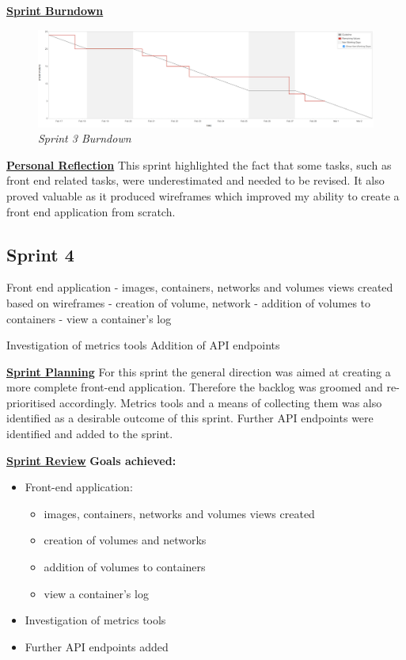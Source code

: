\underline{\textbf{Sprint Burndown}}\newline
\begin{figure}[!ht]
\centering
\includegraphics*[width=\textwidth]{images/sprint3}
\caption{\em Sprint 3 Burndown}
\label{fig:sprint3}
\end{figure}

\underline{\textbf{Personal Reflection}}\newline
This sprint highlighted the fact that some tasks, such as front end related tasks, were underestimated and needed to be revised. It also proved valuable as it produced wireframes which improved my ability to create a front end application from scratch.

\subsection{Sprint 4}
Front end application
	- images, containers, networks and volumes views created based on wireframes
	- creation of volume, network
	- addition of volumes to containers
	- view a container's log
	
Investigation of metrics tools
Addition of API endpoints

\underline{\textbf{Sprint Planning}}\newline
For this sprint the general direction was aimed at creating a more complete front-end application. Therefore the backlog was groomed and re-prioritised accordingly. Metrics tools and a means of collecting them was also identified as a desirable outcome of this sprint. Further API endpoints were identified and added to the sprint.

\underline{\textbf{Sprint Review}}\newline
\textbf{Goals achieved:}
\begin{itemize}
	\item Front-end application:
	\begin{itemize}
		\item images, containers, networks and volumes views created
		\item creation of volumes and networks
		\item addition of volumes to containers
		\item view a container's log
	\end{itemize}
	\item Investigation of metrics tools
	\item Further API endpoints added
\end{itemize}

